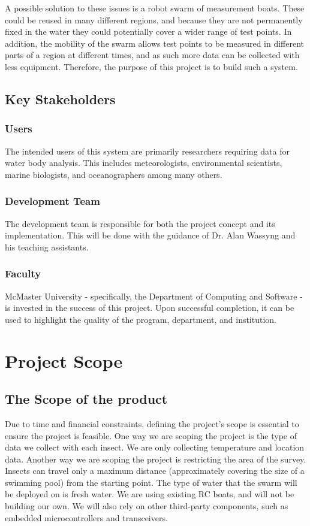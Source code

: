 \documentclass[11pt]{article}
\begin{document}
A possible solution to these issues is a robot swarm of measurement boats. These could be reused in many different regions, and because they are not permanently fixed in the water they could potentially cover a wider range of test points. In addition, the mobility of the swarm allows test points to be measured in different parts of a region at different times, and as such more data can be collected with less equipment. Therefore, the purpose of this project is to build such a system.

\subsection{Key Stakeholders}
\subsubsection{Users}
The intended users of this system are primarily researchers requiring data for water body analysis. This includes meteorologists, environmental scientists, marine biologists, and oceanographers among many others.
\subsubsection{Development Team}
The development team is responsible for both the project concept and its implementation. This will be done with the guidance of Dr. Alan Wassyng and his teaching assistants.
\subsubsection{Faculty}
McMaster University - specifically, the Department of Computing and Software - is invested in the success of this project. Upon successful completion, it can be used to highlight the quality of the program, department, and institution.

\section{Project Scope}
\subsection{The Scope of the product}
Due to time and financial constraints, defining the project's scope is essential to ensure the project is feasible. One way we are scoping the project is the type of data we collect with each insect. We are only collecting temperature and location data. Another way we are scoping the project is restricting the area of the survey. Insects can travel only a maximum distance (approximately covering the size of a swimming pool) from the starting point. The type of water that the swarm will be deployed on is fresh water. We are using existing RC boats, and will not be building our own. We will also rely on other third-party components, such as embedded microcontrollers and transceivers.
\end{document}
